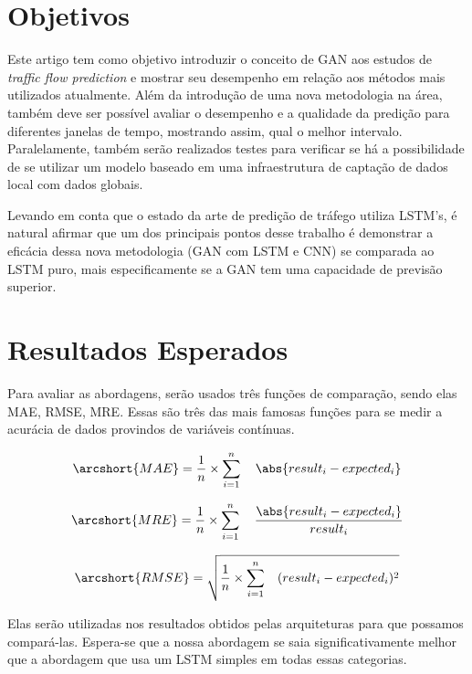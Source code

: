 \section{Objetivos}

Este artigo tem como objetivo introduzir o conceito de \acrshort{GAN} aos estudos de \textit{traffic flow prediction} e mostrar seu desempenho em relação aos métodos mais utilizados atualmente. Além da introdução de uma nova metodologia na área, também deve ser possível avaliar o desempenho e a qualidade da predição para diferentes janelas de tempo, mostrando assim, qual o melhor intervalo. Paralelamente, também serão realizados testes para verificar se há a possibilidade de se utilizar um modelo baseado em uma infraestrutura de captação de dados local com dados globais. 

Levando em conta que o estado da arte de predição de tráfego utiliza LSTM's, é natural afirmar que um dos principais pontos desse trabalho é demonstrar a eficácia dessa nova metodologia (GAN com LSTM e CNN) se comparada ao LSTM puro, mais especificamente se a GAN tem uma capacidade de previsão superior.

\section{Resultados Esperados}
Para avaliar as abordagens, serão usados três funções de comparação, sendo elas \acrfull{MAE}, \acrfull{RMSE}, \acrfull{MRE}. Essas são três das mais famosas funções para se medir a acurácia de dados provindos de variáveis contínuas. 


\begin{equation}
\arcshort{MAE} = \frac{1}{n} \times \sum_{i=1}^{n} \quad \abs{result_i - expected_i}
\end{equation}

\begin{equation}
\arcshort{MRE} = \frac{1}{n} \times \sum_{i=1}^{n} \quad \frac{\abs{result_i - expected_i}}{result_i}
\end{equation}

\begin{equation}
\arcshort{RMSE} = \sqrt{ \frac{1}{n} \times \sum_{i=1}^{n} \quad (result_i - expected_i) ^ 2}
\end{equation}

Elas serão utilizadas nos resultados obtidos pelas arquiteturas para que possamos compará-las. Espera-se que a nossa abordagem se saia significativamente melhor que a abordagem que usa um \acrshort{LSTM} simples em todas essas categorias.
    
